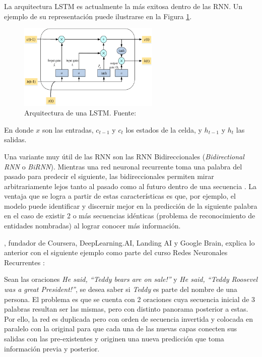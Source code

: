 \begin{itemize}
\begin{itemize}
		La arquitectura LSTM es actualmente la más exitosa dentro de las RNN. Un ejemplo de su representación puede ilustrarse en la Figura \ref{2:fig43}.
		
		\begin{figure}[!ht]
			\begin{center}
				\includegraphics[width=0.6\textwidth]{2/figures/lstm.png}
				\caption{Arquitectura de una LSTM. Fuente: \cite{tec_yuan2019lstm}}
				\label{2:fig43}
			\end{center}
		\end{figure}
	
		En donde $x$ son las entradas, $c_{t-1}$ y $c_{t}$ los estados de la celda, y $h_{t-1}$ y $h_{t}$  las salidas.
		
		Una variante muy útil de las RNN son las RNN Bidireccionales (\textit{Bidirectional RNN} o \textit{BiRNN}). Mientras una red neuronal recurrente toma una palabra del pasado para predecir el siguiente, las bidireccionales permiten mirar arbitrariamente lejos tanto al pasado como al futuro dentro de una secuencia \parencite{bk_goldberg2017nn_nlp}.
		La ventaja que se logra a partir de estas características es que, por ejemplo, el modelo puede identificar y discernir mejor en la predicción de la siguiente palabra en el caso de existir 2 o más secuencias idénticas (problema de reconocimiento de entidades nombradas) al lograr conocer más información.
		
		\citeauthor{tec_ng2018bidirectionalRNN}, fundador de Coursera, DeepLearning.AI, Landing AI y Google Brain, explica lo anterior con el siguiente ejemplo como parte del curso Redes Neuronales Recurrentes \parencite{tec_ng2018bidirectionalRNN}:
		
		Sean las oraciones \textit{He said, “Teddy bears are on sale!”} y \textit{He said, “Teddy Roosevel was a great President!”}, se desea saber si \textit{Teddy} es parte del nombre de una persona. El problema es que se cuenta con 2 oraciones cuya secuencia inicial de 3 palabras resultan ser las mismas, pero con distinto panorama posterior a estas. Por ello, la red es duplicada pero con orden de secuencia invertida y colocada en paralelo con la original para que cada una de las nuevas capas conecten sus salidas con las pre-existentes y originen una nueva predicción que toma información previa y posterior.
		

\end{itemize}
\end{itemize}
